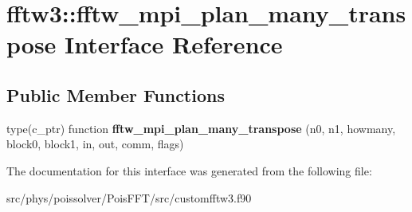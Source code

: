 \hypertarget{interfacefftw3_1_1fftw__mpi__plan__many__transpose}{}\section{fftw3\+:\+:fftw\+\_\+mpi\+\_\+plan\+\_\+many\+\_\+transpose Interface Reference}
\label{interfacefftw3_1_1fftw__mpi__plan__many__transpose}
\subsection*{Public Member Functions}
\begin{DoxyCompactItemize}
\item 
type(c\+\_\+ptr) function {\bfseries fftw\+\_\+mpi\+\_\+plan\+\_\+many\+\_\+transpose} (n0, n1, howmany, block0, block1, in, out, comm, flags)\hypertarget{interfacefftw3_1_1fftw__mpi__plan__many__transpose_aa26e53ef52b52584007f4552dde24e43}{}\label{interfacefftw3_1_1fftw__mpi__plan__many__transpose_aa26e53ef52b52584007f4552dde24e43}

\end{DoxyCompactItemize}


The documentation for this interface was generated from the following file\+:\begin{DoxyCompactItemize}
\item 
src/phys/poissolver/\+Pois\+F\+F\+T/src/customfftw3.\+f90\end{DoxyCompactItemize}
